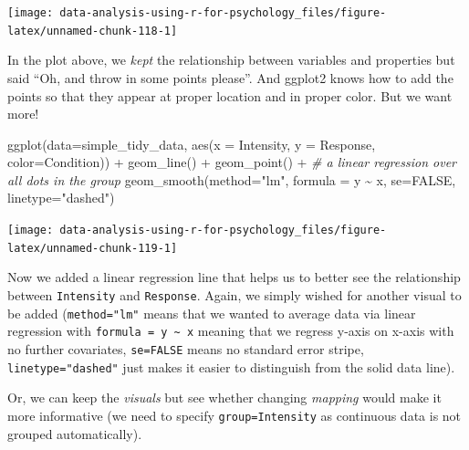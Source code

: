 \documentclass[
]{book}
\newenvironment{Shaded}{\begin{snugshade}}{\end{snugshade}}
\newcommand{\AttributeTok}[1]{\textcolor[rgb]{0.77,0.63,0.00}{#1}}
\newcommand{\CommentTok}[1]{\textcolor[rgb]{0.56,0.35,0.01}{\textit{#1}}}
\newcommand{\ConstantTok}[1]{\textcolor[rgb]{0.00,0.00,0.00}{#1}}
\newcommand{\FunctionTok}[1]{\textcolor[rgb]{0.00,0.00,0.00}{#1}}
\newcommand{\NormalTok}[1]{#1}
\newcommand{\SpecialCharTok}[1]{\textcolor[rgb]{0.00,0.00,0.00}{#1}}
\newcommand{\StringTok}[1]{\textcolor[rgb]{0.31,0.60,0.02}{#1}}
\begin{document}
\begin{center}\texttt{[image: data-analysis-using-r-for-psychology\_files/figure-latex/unnamed-chunk-118-1]} \end{center}

In the plot above, we \emph{kept} the relationship between variables and properties but said ``Oh, and throw in some points please''. And ggplot2 knows how to add the points so that they appear at proper location and in proper color. But we want more!

\begin{Shaded}
\begin{Highlighting}[]
\FunctionTok{ggplot}\NormalTok{(}\AttributeTok{data=}\NormalTok{simple\_tidy\_data, }\FunctionTok{aes}\NormalTok{(}\AttributeTok{x =}\NormalTok{ Intensity, }\AttributeTok{y =}\NormalTok{ Response, }\AttributeTok{color=}\NormalTok{Condition)) }\SpecialCharTok{+} 
  \FunctionTok{geom\_line}\NormalTok{() }\SpecialCharTok{+}
  \FunctionTok{geom\_point}\NormalTok{() }\SpecialCharTok{+}
  \CommentTok{\# a linear regression over all dots in the group}
  \FunctionTok{geom\_smooth}\NormalTok{(}\AttributeTok{method=}\StringTok{"lm"}\NormalTok{, }\AttributeTok{formula =}\NormalTok{ y }\SpecialCharTok{\textasciitilde{}}\NormalTok{ x, }\AttributeTok{se=}\ConstantTok{FALSE}\NormalTok{, }\AttributeTok{linetype=}\StringTok{"dashed"}\NormalTok{) }
\end{Highlighting}
\end{Shaded}

\begin{center}\texttt{[image: data-analysis-using-r-for-psychology\_files/figure-latex/unnamed-chunk-119-1]} \end{center}

Now we added a linear regression line that helps us to better see the relationship between \texttt{Intensity} and \texttt{Response}. Again, we simply wished for another visual to be added (\texttt{method="lm"} means that we wanted to average data via linear regression with \texttt{formula\ =\ y\ \textasciitilde{}\ x} meaning that we regress y-axis on x-axis with no further covariates, \texttt{se=FALSE} means no standard error stripe, \texttt{linetype="dashed"} just makes it easier to distinguish from the solid data line).

Or, we can keep the \emph{visuals} but see whether changing \emph{mapping} would make it more informative (we need to specify \texttt{group=Intensity} as continuous data is not grouped automatically).
\end{document}
